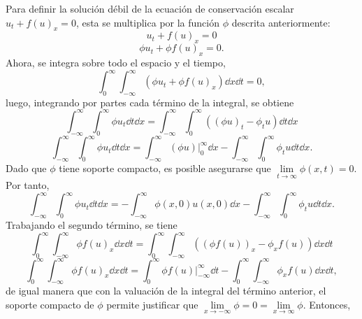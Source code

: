 Para definir la solución débil de la ecuación de conservación escalar $u_t + f(u)_x = 0$, esta se multiplica por la función $\phi$ descrita anteriormente:
\begin{equation}
	u_t + f(u)_x = 0
	\label{eq:conser-u}
\end{equation}
\begin{equation}
	\phi u_t + \phi f(u)_x = 0.
\end{equation}
Ahora, se integra sobre todo el espacio y el tiempo,
\begin{equation}
	\int_{0}^{\infty}\int_{-\infty}^{\infty}\left(\phi u_t + \phi f(u)_x\right) \dd{x}\dd{t} = 0,
\end{equation}
luego, integrando por partes cada término de la integral, se obtiene
\begin{equation}
	\int_{-\infty}^{\infty}\int_{0}^{\infty} \phi u_t \dd{t}\dd{x} = \int_{-\infty}^{\infty}\int_{0}^{\infty} \left((\phi u)_t - \phi_t u\right) \dd{t}\dd{x}
\end{equation}
\begin{equation}
	\int_{-\infty}^{\infty}\int_{0}^{\infty} \phi u_t \dd{t}\dd{x} = \int_{-\infty}^{\infty} (\phi u) \Big|_{0}^{\infty}\dd{x} - \int_{-\infty}^{\infty}\int_{0}^{\infty}\phi_t u \dd{t}\dd{x}.
\end{equation}
Dado que $\phi$ tiene soporte compacto, es posible asegurarse que $\lim\limits_{t\rightarrow \infty}\phi(x,t) = 0$. Por tanto,
\begin{equation}
	\int_{-\infty}^{\infty}\int_{0}^{\infty} \phi u_t \dd{t}\dd{x} = 
	-\int_{-\infty}^{\infty} \phi(x,0)u(x,0) \dd{x} - \int_{-\infty}^{\infty}\int_{0}^{\infty}\phi_t u \dd{t}\dd{x}.
\end{equation}
Trabajando el segundo término, se tiene
\begin{equation}
	\int_{0}^{\infty}\int_{-\infty}^{\infty}  \phi f(u)_x \dd{x}\dd{t} = 
	\int_{0}^{\infty}\int_{-\infty}^{\infty} \left((\phi f(u))_x - \phi_x f(u)\right) \dd{x}\dd{t}
\end{equation}
\begin{equation}
	\int_{0}^{\infty}\int_{-\infty}^{\infty}  \phi f(u)_x \dd{x}\dd{t} = 
	\int_{0}^{\infty} \phi f(u) \Big|_{-\infty}^{\infty} \dd{t}  - \int_{0}^{\infty}\int_{-\infty}^{\infty} \phi_x f(u) \dd{x}\dd{t},
\end{equation}
de igual manera que con la valuación de la integral del término anterior, el soporte compacto de $\phi$ permite justificar que $\lim\limits_{x\rightarrow -\infty}\phi = 0 = \lim\limits_{x\rightarrow \infty}\phi$. Entonces,
